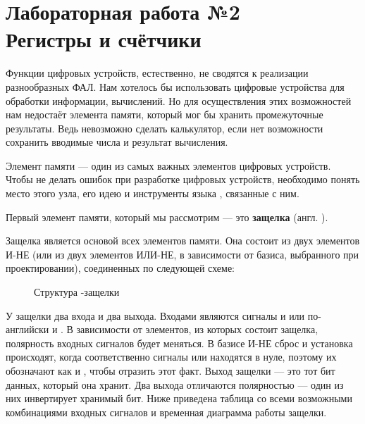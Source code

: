 \chapter{Лабораторная работа №2\\Регистры и счётчики}

\par{Функции цифровых устройств, естественно, не сводятся к реализации разнообразных ФАЛ. Нам хотелось бы использовать цифровые устройства для обработки информации, вычислений. Но для осуществления этих возможностей нам недостаёт элемента памяти, который мог бы хранить промежуточные результаты. Ведь невозможно сделать калькулятор, если нет возможности сохранить вводимые числа и результат вычисления.}

\par{Элемент памяти — один из самых важных элементов цифровых устройств. Чтобы не делать ошибок при разработке цифровых устройств, необходимо понять место этого узла, его идею и инструменты языка , связанные с ним.}

\par{Первый элемент памяти, который мы рассмотрим — это  \textbf{защелка} (англ. ).}

\par{Защелка является основой всех элементов памяти. Она состоит из двух элементов И-НЕ (или из двух элементов ИЛИ-НЕ, в зависимости от базиса, выбранного при проектировании), соединенных по следующей схеме:}

\begin{figure}[H]
  \centering
  \def\svgwidth{\columnwidth}
  
  \caption{Структура -защелки}
\end{figure}

\par{У защелки два входа и два выхода. Входами являются сигналы  и  или по-английски  и . В зависимости от элементов, из которых состоит защелка, полярность входных сигналов будет меняться. В базисе И-НЕ сброс и установка происходят, когда соответственно сигналы  или  находятся в нуле, поэтому их обозначают как  и , чтобы отразить этот факт. Выход защелки — это тот бит данных, который она хранит. Два выхода отличаются полярностью — один из них инвертирует хранимый бит. Ниже приведена таблица со всеми возможными комбинациями входных сигналов и временная диаграмма работы защелки.}

